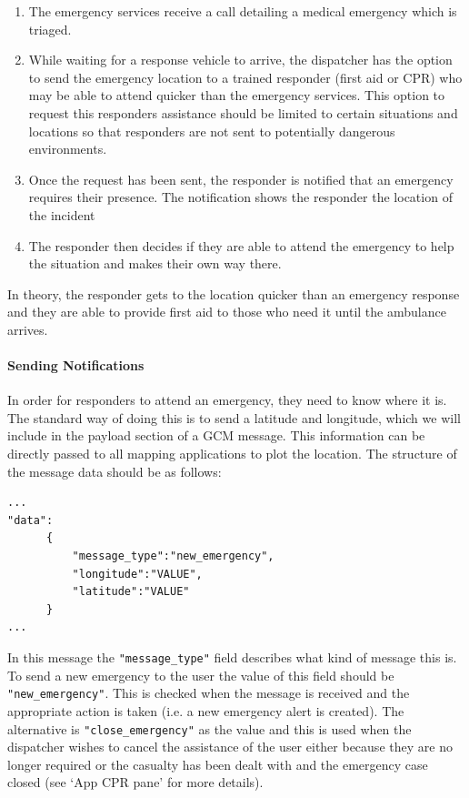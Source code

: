 \documentclass{article}
\begin{document}
	\begin{enumerate}
  		\item The emergency services receive a call detailing a medical emergency which is triaged.
  		\item While waiting for a response vehicle to arrive, the dispatcher has the option to send the emergency location to a trained responder (first aid or CPR) who may be able to attend quicker than the emergency services. This option to request this responders assistance should be limited to certain situations and locations so that responders are not sent to potentially dangerous environments.
  		\item Once the request has been sent, the responder is notified that an emergency requires their presence. The notification shows the responder the location of the incident
  		\item The responder then decides if they are able to attend the emergency to help the situation and makes their own way there.
	\end{enumerate}
	In theory, the responder gets to the location quicker than an emergency response and they are able to provide first aid to those who need it until the ambulance arrives.\\
	\paragraph{Sending Notifications}
	In order for responders to attend an emergency, they need to know where it is. The standard way of doing this is to send a latitude and longitude, which we will include in the payload section of a GCM message. This information can be directly passed to all mapping applications to plot the location. The structure of the message data should be as follows:
	\begin{lstlisting}
...
"data":
      {
          "message_type":"new_emergency",
          "longitude":"VALUE",
          "latitude":"VALUE"
      }
...
	\end{lstlisting}
In this message the \texttt{\color{OliveGreen}"message\_type"} field describes what kind of message this is. To send a new emergency to the user the value of this field should be \texttt{\color{OliveGreen}"new\_emergency"}. This is checked when the message is received and the appropriate action is taken (i.e. a new emergency alert is created). The alternative is \texttt{\color{OliveGreen}"close\_emergency"} as the value and this is used when the dispatcher wishes to cancel the assistance of the user either because they are no longer required or the casualty has been dealt with and the emergency case closed (see ‘App CPR pane’ for more details). \\
\end{document}
